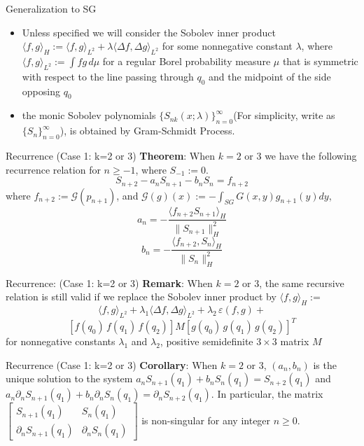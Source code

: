 \documentclass[xcolor = dvipsnames]{beamer}
\newcommand{\lap}{\Delta}
\begin{document}
\begin{frame}{Generalization to SG}
\begin{itemize}
\item Unless specified we will consider the Sobolev inner product $\langle f,g\rangle_H:=\langle f,g\rangle_{L^2}+\lambda\langle \lap f,\lap g\rangle_{L^2}$ for some nonnegative 
constant $\lambda$, where $\langle f,g\rangle_{L^2}:=\int fg\,d\mu$ for a regular Borel probability measure $\mu$ that is symmetric with respect to the line passing through $q_0$ and the midpoint of the side opposing $q_0$\pause
\item the monic Sobolev polynomials $\{S_{nk}(x;\lambda)\}_{n=0}^{\infty}$(For simplicity, write as $\{S_{n}\}_{n=0}^{\infty}$), is obtained by Gram-Schmidt Process.

\end{itemize}
\end{frame}
\begin{frame}{Recurrence (Case 1: k=2 or 3)}
\textbf{Theorem}: When $k = 2$ or $3$ we have the following recurrence relation for $n\geq-1$, where $S_{-1}:=0$.
$$S_{n+2} - a_nS_{n+1}-b_nS_n = f_{n+2}$$
where 
$f_{n+2} := \mathcal{G}(p_{n+1})$, and $\mathcal{G}(g)(x):=-\int_{SG}G(x,y)g_{n+1}(y)dy$,\\ $$a_n = -\frac{\langle f_{n+2}S_{n+1}\rangle_H}{\|S_{n+1}\|_H^2}$$ $$b_n = -\frac{\langle f_{n+2},S_{n}\rangle_H}{\|S_{n}\|_H^2}$$

    
\end{frame}
\begin{frame}{Recurrence: (Case 1: k=2 or 3)}
    \textbf{Remark}: When $k = 2$ or $3$, the same recursive relation is still valid if we replace the Sobolev inner product by $\langle f,g\rangle_H:=$ $$\langle f,g\rangle_{L^2}+\lambda_1 \langle \lap f,\lap g\rangle_{L^2}+\lambda_2\,\varepsilon(f,g)+$$ $$[f(q_0)\,f(q_1)\,f(q_2)] M [g(q_0)\,g(q_1)\,g(q_2)]^T$$ for nonnegative constants $\lambda_1$ and $\lambda_2$, positive semidefinite $3\times3$ matrix $M$
\end{frame}
\begin{frame}{Recurrence (Case 1: k=2 or 3)}
    \textbf{Corollary}: When $k =2$ or $3$, $(a_n, b_n)$ is the unique solution to the system $a_n S_{n+1}(q_1)+b_nS_n(q_1)=S_{n+2}(q_1)$ and $a_n \partial_n S_{n+1}(q_1)+b_n\partial_n S_n(q_1)=\partial_n S_{n+2}(q_1)$. In particular, the matrix $\left[\begin{matrix}
S_{n+1}(q_1)&S_n(q_1)\\
\partial_n S_{n+1}(q_1) &\partial_n S_n(q_1)
\end{matrix}\right]$ is non-singular for any integer $n\geq 0$.

\end{frame}
\end{document}
